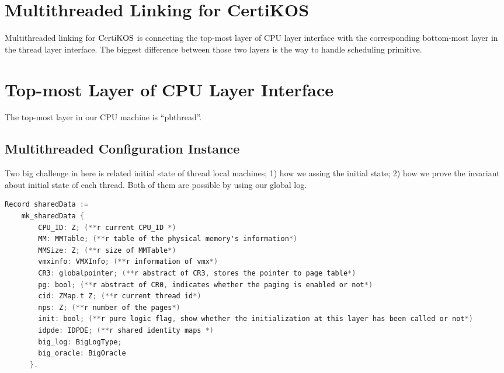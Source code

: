 \section{Multithreaded Linking for CertiKOS}
\label{chapter:certikos:sec:multithreaded-linking-for-certikos}

Multithreaded linking for $\mathrm{CertiKOS}$ is connecting the top-most layer of CPU layer
 interface with
the corresponding bottom-most layer in the thread layer interface. 
The biggest difference between those two layers is 
the way to handle scheduling primitive. 



\section{Top-most Layer of CPU Layer Interface}
\label{chapter:certikos:subsec:pbthread}

The top-most layer in our CPU machine is ``pbthread''.





\subsection{Multithreaded Configuration Instance}
\label{chapter:certikos:subsec:multithreaded-configuration-instance}

Two big challenge in here is related initial state of thread local machines; 
1) how we assing the initial state; 2) how we prove the invariant about initial state 
of each thread. 
Both of them are possible by using our global log. 

\begin{lstlisting}[language=C]
  Record sharedData :=
    mk_sharedData {
        CPU_ID: Z; (**r current CPU_ID *)
        MM: MMTable; (**r table of the physical memory's information*)
        MMSize: Z; (**r size of MMTable*)
        vmxinfo: VMXInfo; (**r information of vmx*)
        CR3: globalpointer; (**r abstract of CR3, stores the pointer to page table*)
        pg: bool; (**r abstract of CR0, indicates whether the paging is enabled or not*)
        cid: ZMap.t Z; (**r current thread id*)
        nps: Z; (**r number of the pages*)
        init: bool; (**r pure logic flag, show whether the initialization at this layer has been called or not*)
        idpde: IDPDE; (**r shared identity maps *)
        big_log: BigLogType;
        big_oracle: BigOracle
      }.
\end{lstlisting}

